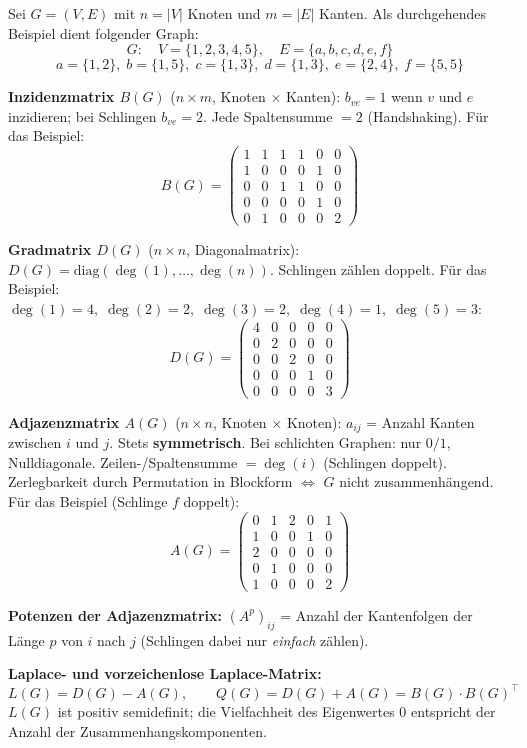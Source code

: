 Sei $G=(V,E)$ mit $n=|V|$ Knoten und $m=|E|$ Kanten. Als durchgehendes Beispiel dient folgender Graph:
\[G:\quad V=\{1,2,3,4,5\},\quad E=\{a,b,c,d,e,f\}\]
\[a=\{1,2\},\;b=\{1,5\},\;c=\{1,3\},\;d=\{1,3\},\;e=\{2,4\},\;f=\{5,5\}\]

\textbf{Inzidenzmatrix $B(G)$} ($n\times m$, Knoten $\times$ Kanten): $b_{ve}=1$ wenn $v$ und $e$ inzidieren; bei Schlingen $b_{ve}=2$. Jede Spaltensumme $=2$ (Handshaking). Für das Beispiel:
\[B(G)=\begin{pmatrix}1&1&1&1&0&0\\1&0&0&0&1&0\\0&0&1&1&0&0\\0&0&0&0&1&0\\0&1&0&0&0&2\end{pmatrix}\]

\textbf{Gradmatrix $D(G)$} ($n\times n$, Diagonalmatrix): $D(G)=\mathrm{diag}(\deg(1),\ldots,\deg(n))$. Schlingen zählen doppelt. Für das Beispiel: $\deg(1)=4,\;\deg(2)=2,\;\deg(3)=2,\;\deg(4)=1,\;\deg(5)=3$:
\[D(G)=\begin{pmatrix}4&0&0&0&0\\0&2&0&0&0\\0&0&2&0&0\\0&0&0&1&0\\0&0&0&0&3\end{pmatrix}\]

\textbf{Adjazenzmatrix $A(G)$} ($n\times n$, Knoten $\times$ Knoten): $a_{ij}$ = Anzahl Kanten zwischen $i$ und $j$. Stets \textbf{symmetrisch}. Bei schlichten Graphen: nur $0/1$, Nulldiagonale. Zeilen-/Spaltensumme $=\deg(i)$ (Schlingen doppelt). Zerlegbarkeit durch Permutation in Blockform $\Leftrightarrow$ $G$ nicht zusammenhängend. Für das Beispiel (Schlinge $f$ doppelt):
\[A(G)=\begin{pmatrix}0&1&2&0&1\\1&0&0&1&0\\2&0&0&0&0\\0&1&0&0&0\\1&0&0&0&2\end{pmatrix}\]

\textbf{Potenzen der Adjazenzmatrix:} $(A^p)_{ij}$ = Anzahl der Kantenfolgen der Länge $p$ von $i$ nach $j$ (Schlingen dabei nur \emph{einfach} zählen).

\textbf{Laplace- und vorzeichenlose Laplace-Matrix:}
\[L(G) = D(G) - A(G), \qquad Q(G) = D(G) + A(G) = B(G)\cdot B(G)^\top\]
$L(G)$ ist positiv semidefinit; die Vielfachheit des Eigenwertes $0$ entspricht der Anzahl der Zusammenhangskomponenten.

